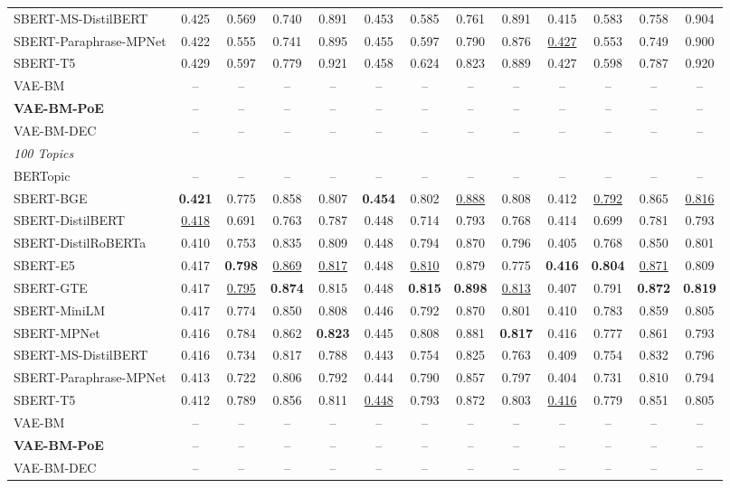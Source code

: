 \begin{table}[t]
{\begin{tabular}{lcccccccccccc}
SBERT-MS-DistilBERT & 0.425 & 0.569 & 0.740 & 0.891 & 0.453 & 0.585 & 0.761 & 0.891 & 0.415 & 0.583 & 0.758 & 0.904 \\
SBERT-Paraphrase-MPNet & 0.422 & 0.555 & 0.741 & 0.895 & 0.455 & 0.597 & 0.790 & 0.876 & \underline{0.427} & 0.553 & 0.749 & 0.900 \\
SBERT-T5 & 0.429 & 0.597 & 0.779 & 0.921 & 0.458 & 0.624 & 0.823 & 0.889 & 0.427 & 0.598 & 0.787 & 0.920 \\
\midrule
VAE-BM & -- & -- & -- & -- & -- & -- & -- & -- & -- & -- & -- & -- \\
\textbf{VAE-BM-PoE} & -- & -- & -- & -- & -- & -- & -- & -- & -- & -- & -- & -- \\
VAE-BM-DEC & -- & -- & -- & -- & -- & -- & -- & -- & -- & -- & -- & -- \\
\midrule
\multicolumn{13}{l}{\textit{100 Topics}} \\
BERTopic & -- & -- & -- & -- & -- & -- & -- & -- & -- & -- & -- & -- \\
SBERT-BGE & \textbf{0.421} & 0.775 & 0.858 & 0.807 & \textbf{0.454} & 0.802 & \underline{0.888} & 0.808 & 0.412 & \underline{0.792} & 0.865 & \underline{0.816} \\
SBERT-DistilBERT & \underline{0.418} & 0.691 & 0.763 & 0.787 & 0.448 & 0.714 & 0.793 & 0.768 & 0.414 & 0.699 & 0.781 & 0.793 \\
SBERT-DistilRoBERTa & 0.410 & 0.753 & 0.835 & 0.809 & 0.448 & 0.794 & 0.870 & 0.796 & 0.405 & 0.768 & 0.850 & 0.801 \\
SBERT-E5 & 0.417 & \textbf{0.798} & \underline{0.869} & \underline{0.817} & 0.448 & \underline{0.810} & 0.879 & 0.775 & \textbf{0.416} & \textbf{0.804} & \underline{0.871} & 0.809 \\
SBERT-GTE & 0.417 & \underline{0.795} & \textbf{0.874} & 0.815 & 0.448 & \textbf{0.815} & \textbf{0.898} & \underline{0.813} & 0.407 & 0.791 & \textbf{0.872} & \textbf{0.819} \\
SBERT-MiniLM & 0.417 & 0.774 & 0.850 & 0.808 & 0.446 & 0.792 & 0.870 & 0.801 & 0.410 & 0.783 & 0.859 & 0.805 \\
SBERT-MPNet & 0.416 & 0.784 & 0.862 & \textbf{0.823} & 0.445 & 0.808 & 0.881 & \textbf{0.817} & 0.416 & 0.777 & 0.861 & 0.793 \\
SBERT-MS-DistilBERT & 0.416 & 0.734 & 0.817 & 0.788 & 0.443 & 0.754 & 0.825 & 0.763 & 0.409 & 0.754 & 0.832 & 0.796 \\
SBERT-Paraphrase-MPNet & 0.413 & 0.722 & 0.806 & 0.792 & 0.444 & 0.790 & 0.857 & 0.797 & 0.404 & 0.731 & 0.810 & 0.794 \\
SBERT-T5 & 0.412 & 0.789 & 0.856 & 0.811 & \underline{0.448} & 0.793 & 0.872 & 0.803 & \underline{0.416} & 0.779 & 0.851 & 0.805 \\
\midrule
VAE-BM & -- & -- & -- & -- & -- & -- & -- & -- & -- & -- & -- & -- \\
\textbf{VAE-BM-PoE} & -- & -- & -- & -- & -- & -- & -- & -- & -- & -- & -- & -- \\
VAE-BM-DEC & -- & -- & -- & -- & -- & -- & -- & -- & -- & -- & -- & -- \\
\bottomrule
\end{tabular}
}
\end{table}
